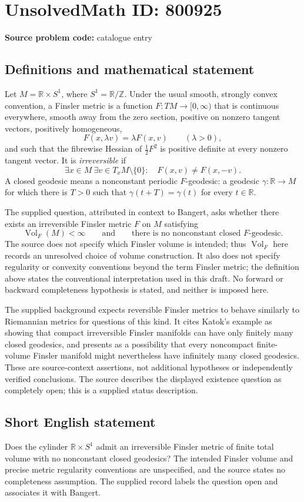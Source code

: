 \documentclass[11pt]{article}
\newcommand{\Z}{\mathbb{Z}}
\newcommand{\R}{\mathbb{R}}
\begin{document}
\section*{UnsolvedMath ID: 800925}
\textbf{Source problem code:} catalogue entry
\subsection{Definitions and mathematical statement}
Let \(M=\R\times S^1\), where \(S^1=\R/\Z\). Under the usual smooth, strongly convex convention, a Finsler metric is a function \(F:TM\to[0,\infty)\) that is continuous everywhere, smooth away from the zero section, positive on nonzero tangent vectors, positively homogeneous,
\[
F(x,\lambda v)=\lambda F(x,v)\qquad(\lambda>0),
\]
and such that the fibrewise Hessian of \(\tfrac12F^2\) is positive definite at every nonzero tangent vector. It is \emph{irreversible} if
\[
\exists x\in M\ \exists v\in T_xM\setminus\{0\}:\quad F(x,v)\ne F(x,-v).
\]
A closed geodesic means a nonconstant periodic \(F\)-geodesic: a geodesic \(\gamma:\R\to M\) for which there is \(T>0\) such that \(\gamma(t+T)=\gamma(t)\) for every \(t\in\R\).

The supplied question, attributed in context to Bangert, asks whether there exists an irreversible Finsler metric \(F\) on \(M\) satisfying
\[
\operatorname{Vol}_{F}(M)<\infty
\qquad\text{and}\qquad
\text{there is no nonconstant closed }F\text{-geodesic}.
\]
The source does not specify which Finsler volume is intended; thus \(\operatorname{Vol}_{F}\) here records an unresolved choice of volume construction. It also does not specify regularity or convexity conventions beyond the term Finsler metric; the definition above states the conventional interpretation used in this draft. No forward or backward completeness hypothesis is stated, and neither is imposed here.

The supplied background expects reversible Finsler metrics to behave similarly to Riemannian metrics for questions of this kind. It cites Katok's example as showing that compact irreversible Finsler manifolds can have only finitely many closed geodesics, and presents as a possibility that every noncompact finite-volume Finsler manifold might nevertheless have infinitely many closed geodesics. These are source-context assertions, not additional hypotheses or independently verified conclusions. The source describes the displayed existence question as completely open; this is a supplied status description.
\subsection{Short English statement}
Does the cylinder \(\R\times S^1\) admit an irreversible Finsler metric of finite total volume with no nonconstant closed geodesics? The intended Finsler volume and precise metric regularity conventions are unspecified, and the source states no completeness assumption. The supplied record labels the question open and associates it with Bangert.
\end{document}
